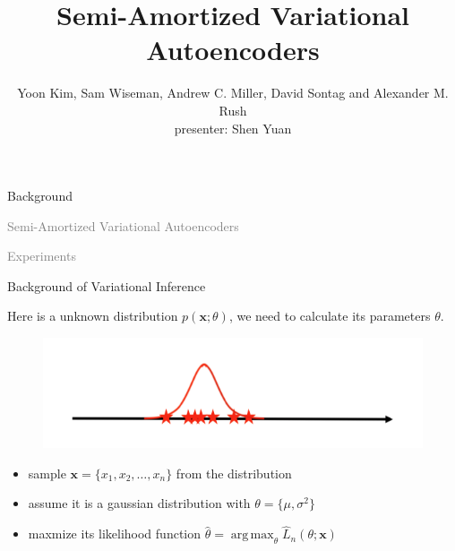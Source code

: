 \documentclass{beamer}		%
\title[Semi-Amortized Variational Autoencoders]{Semi-Amortized Variational Autoencoders}	%
\author[Yoon Kim, Sam Wiseman, Andrew C. Miller, David Sontag and Alexander M. Rush ]{Yoon Kim, Sam Wiseman, Andrew C. Miller, David Sontag and Alexander M. Rush \\  presenter: Shen Yuan} %
\newcommand{\light}[1]{\textcolor{gray}{#1}}
\DeclareMathOperator*{\argmax}{arg\,max}
\begin{document}



\begin{frame}	

\titlepage	%
	
\end{frame}	


\begin{frame}[noframenumbering]
\begin{itemize}
    \begin{LARGE}
    \item Background
    \item \light{Semi-Amortized Variational Autoencoders}
    \item \light{Experiments}
    \end{LARGE}
\end{itemize}
\end{frame}



\begin{frame}{Background of Variational Inference}

Here is a unknown distribution $p(\bm{x};\theta)$, we need to calculate its parameters $\theta$.

\begin{figure}[t]
\centerline{\includegraphics[width=0.7\linewidth]{figure1.png}}
\vspace{-10pt}
\label{fig1}
\end{figure}

\begin{itemize}
    \pause
    \item sample $\bm{x}=\{x_1, x_2, \ldots, x_n\}$ from the distribution
    \pause
    \item assume it is a gaussian distribution with $\theta = \{\mu, \sigma^2\}$
    \pause
    \item maxmize its likelihood function $\hat{\theta} = \argmax_{\theta} \hat{L}_n(\theta;\bm{x})$
\end{itemize}

\end{frame}
\end{document}

